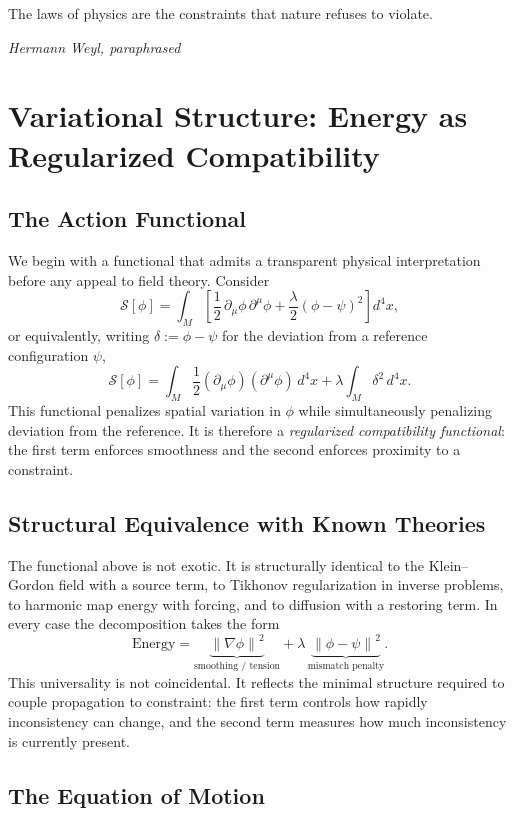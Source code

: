 \documentclass[12pt,a4paper,openany]{book}
\theoremstyle{plain}
\theoremstyle{definition}
\theoremstyle{remark}
\newcommand{\norm}[1]{\left\|#1\right\|}
\begin{document}
\epigraph{%
  The laws of physics are the constraints that nature refuses to violate.
}{%
  \textit{Hermann Weyl, paraphrased}}

\section{Variational Structure: Energy as Regularized Compatibility}
\label{sec:variational_structure}

\subsection{The Action Functional}

We begin with a functional that admits a transparent physical interpretation before any appeal to field theory. Consider
\[
\mathcal{S}[\phi]
=
\int_M \left[\frac{1}{2}\,\partial_\mu \phi\,\partial^\mu \phi + \frac{\lambda}{2}(\phi - \psi)^2\right]d^4x,
\]
or equivalently, writing $\delta := \phi - \psi$ for the deviation from a reference configuration $\psi$,
\[
\mathcal{S}[\phi]
=
\int_M \frac{1}{2}(\partial_\mu\phi)(\partial^\mu\phi)\,d^4x + \lambda\int_M \delta^2\,d^4x.
\]
This functional penalizes spatial variation in $\phi$ while simultaneously penalizing deviation from the reference. It is therefore a \emph{regularized compatibility functional}: the first term enforces smoothness and the second enforces proximity to a constraint.

\subsection{Structural Equivalence with Known Theories}

The functional above is not exotic. It is structurally identical to the Klein--Gordon field with a source term, to Tikhonov regularization in inverse problems, to harmonic map energy with forcing, and to diffusion with a restoring term. In every case the decomposition takes the form
\[
\text{Energy}
=
\underbrace{\norm{\nabla\phi}^2}_{\text{smoothing / tension}}
+
\lambda\,\underbrace{\norm{\phi - \psi}^2}_{\text{mismatch penalty}}.
\]
This universality is not coincidental. It reflects the minimal structure required to couple propagation to constraint: the first term controls how rapidly inconsistency can change, and the second term measures how much inconsistency is currently present.

\subsection{The Equation of Motion}
\end{document}
